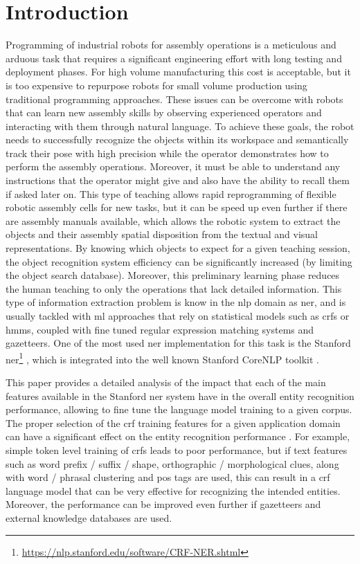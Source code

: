 \section{Introduction}\label{sec:introduction}

Programming of industrial robots for assembly operations is a meticulous and arduous task that requires a significant engineering effort with long testing and deployment phases. For high volume manufacturing this cost is acceptable, but it is too expensive to repurpose robots for small volume production using traditional programming approaches. These issues can be overcome with robots that can learn new assembly skills by observing experienced operators and interacting with them through natural language. To achieve these goals, the robot needs to successfully recognize the objects within its workspace and semantically track their pose with high precision while the operator demonstrates how to perform the assembly operations. Moreover, it must be able to understand any instructions that the operator might give and also have the ability to recall them if asked later on. This type of teaching allows rapid reprogramming of flexible robotic assembly cells for new tasks, but it can be speed up even further if there are assembly manuals available, which allows the robotic system to extract the objects and their assembly spatial disposition from the textual and visual representations. By knowing which objects to expect for a given teaching session, the object recognition system efficiency can be significantly increased (by limiting the object search database). Moreover, this preliminary learning phase reduces the human teaching to only the operations that lack detailed information. This type of information extraction problem is know in the \gls{nlp} domain as \gls{ner}, and is usually tackled with \gls{ml} approaches that rely on statistical models such as \glspl{crf} or \glspl{hmm}, coupled with fine tuned regular expression matching systems and gazetteers. One of the most used \gls{ner} implementation for this task is the Stanford \gls{ner}\footnote{\url{https://nlp.stanford.edu/software/CRF-NER.shtml}} \cite{Finkel2005}, which is integrated into the well known Stanford CoreNLP toolkit \cite{manning2014}.

This paper provides a detailed analysis of the impact that each of the main features available in the Stanford \gls{ner} system have in the overall entity recognition performance, allowing to fine tune the language model training to a given corpus. The proper selection of the \gls{crf} training features for a given application domain can have a significant effect on the entity recognition performance \cite{Tkachenko2012}. For example, simple token level training of \glspl{crf} leads to poor performance, but if text features such as word prefix / suffix / shape, orthographic / morphological clues, along with word / phrasal clustering and \gls{pos} tags are used, this can result in a \gls{crf} language model that can be very effective for recognizing the intended entities. Moreover, the performance can be improved even further if gazetteers and external knowledge databases are used.


